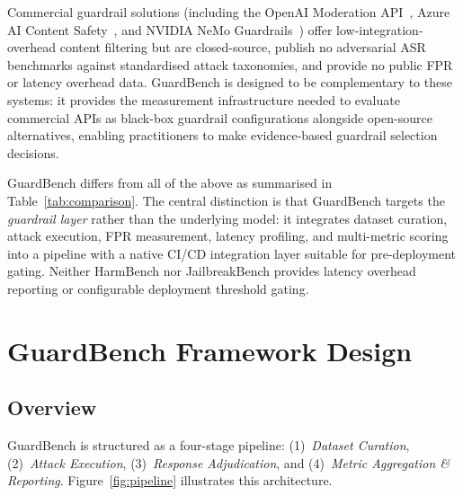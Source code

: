 \documentclass{mdpi}
\begin{document}
Commercial guardrail solutions (including the OpenAI Moderation
API~\cite{openai2023moderation}, Azure AI Content
Safety~\cite{azure2023contentsafety}, and NVIDIA NeMo
Guardrails~\cite{rebedea2023nemo}) offer low-integration-overhead content
filtering but are closed-source, publish no adversarial ASR benchmarks against
standardised attack taxonomies, and provide no public FPR or latency overhead
data.  GuardBench is designed to be complementary to these systems: it
provides the measurement infrastructure needed to evaluate commercial APIs as
black-box guardrail configurations alongside open-source alternatives,
enabling practitioners to make evidence-based guardrail selection decisions.

GuardBench differs from all of the above as summarised in Table~\ref{tab:comparison}.
The central distinction is that GuardBench targets the \emph{guardrail layer}
rather than the underlying model: it integrates dataset curation, attack
execution, FPR measurement, latency profiling, and multi-metric scoring into
a pipeline with a native CI/CD integration layer suitable for pre-deployment
gating.  Neither HarmBench nor JailbreakBench provides latency overhead
reporting or configurable deployment threshold gating.

\section{GuardBench Framework Design}

\subsection{Overview}

GuardBench is structured as a four-stage pipeline: (1)~\emph{Dataset
Curation}, (2)~\emph{Attack Execution}, (3)~\emph{Response Adjudication},
and (4)~\emph{Metric Aggregation \& Reporting}.  Figure~\ref{fig:pipeline}
illustrates this architecture.
\end{document}
